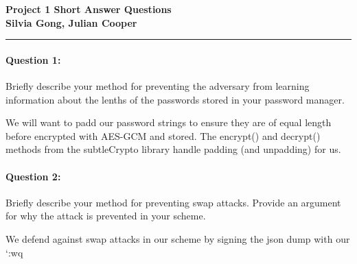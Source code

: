 \documentclass[12pt,letterpaper,twoside]{article}
\begin{document}
{\centering \textbf{Project 1 Short Answer Questions\\ Silvia Gong, Julian Cooper\\}}
\vspace*{-8pt}\noindent\rule{\linewidth}{1pt}

\paragraph{Question 1: } Briefly describe your method for preventing the
adversary from learning information about the lenths of the passwords stored in
your password manager.

We will want to padd our password strings to ensure they are of equal length
before encrypted with AES-GCM and stored. The encrypt() and decrypt() methods
from the subtleCrypto library handle padding (and unpadding) for us.

\paragraph{Question 2: } Briefly describe your method for preventing swap
attacks. Provide an argument for why the attack is prevented in your scheme.

We defend against swap attacks in our scheme by signing the json dump with our
`:wq
\end{document}
